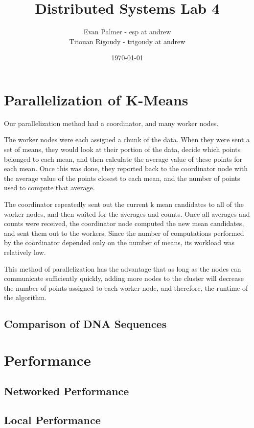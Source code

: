 \documentclass[12pt]{article}
\title{Distributed Systems Lab 4}
\author{
	Evan Palmer - esp at andrew\\
	Titouan Rigoudy - trigoudy at andrew
}
\date{\today}
\begin{document}
\maketitle

\section{Parallelization of K-Means}

Our parallelization method had a coordinator, and many worker nodes.

The worker nodes were each assigned a chunk of the data. When they were sent a set of means, they would look at their portion of the data, decide which points belonged to each mean, and then calculate the average value of these points for each mean. Once this was done, they reported back to the coordinator node with the average value of the points closest to each mean, and the number of points used to compute that average.

The coordinator repeatedly sent out the current k mean candidates to all of the worker nodes, and then waited for the averages and counts. Once all averages and counts were received, the coordinator node computed the new mean candidates, and sent them out to the workers. Since the number of computations performed by the coordinator depended only on the number of means, its workload was relatively low.

This method of parallelization has the advantage that as long as the nodes can communicate sufficiently quickly, adding more nodes to the cluster will decrease the number of points assigned to each worker node, and therefore, the runtime of the algorithm.

\subsection{Comparison of DNA Sequences}

\section{Performance}

\subsection{Networked Performance}

\subsection{Local Performance}
\end{document}
